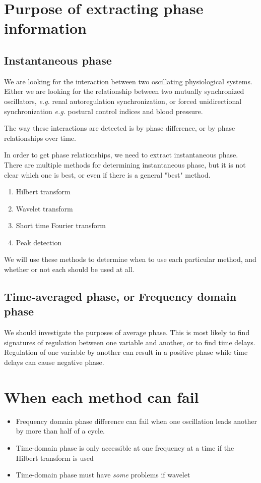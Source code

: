 \documentclass{article}
\begin{document}
\section*{Purpose of extracting phase information}

\subsection*{Instantaneous phase}
We are looking for the interaction between two oscillating physiological systems. Either we are looking for the relationship between two mutually synchronized oscillators, \textit{e.g.} renal autoregulation synchronization, or forced unidirectional synchronization \textit{e.g.} postural control indices and blood pressure. 

The way these interactions are detected is by phase difference, or by phase relationships over time. 

In order to get phase relationships, we need to extract instantaneous phase. There are multiple methods for determining instantaneous phase, but it is not clear which one is best, or even if there is a general "best" method.
\begin{enumerate}
\item Hilbert transform
\item Wavelet transform
\item Short time Fourier transform
\item Peak detection
\end{enumerate}

We will use these methods to determine when to use each particular method, and whether or not each should be used at all.

\subsection*{Time-averaged phase, or Frequency domain phase}

We should investigate the purposes of average phase. This is most likely to find signatures of regulation between one variable and another, or to find time delays. Regulation of one variable by another can result in a positive phase while time delays can cause negative phase.

\section*{When each method can fail}
\begin{itemize}
\item Frequency domain phase difference can fail when one oscillation leads another by more than half of a cycle.
\item Time-domain phase is only accessible at one frequency at a time if the Hilbert transform is used
\item Time-domain phase must have \textit{some} problems if wavelet 
\end{itemize}
\end{document}
